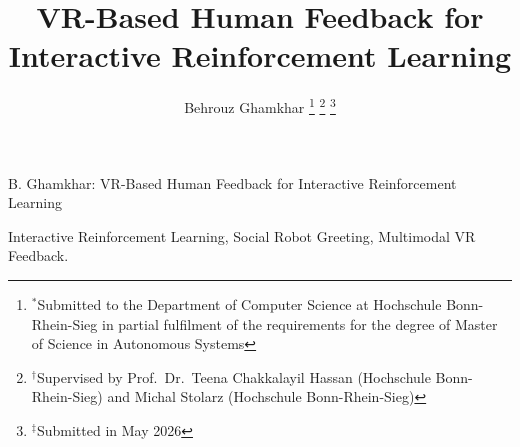 \documentclass[lettersize,journal]{IEEEtran}
\begin{document}
\title{VR-Based Human Feedback for Interactive Reinforcement Learning}

\author{Behrouz Ghamkhar
\thanks{$^*$Submitted to the Department of Computer Science at Hochschule Bonn-Rhein-Sieg in partial fulfilment of the requirements for the degree of Master of Science in Autonomous Systems}
\thanks{$^{\dagger}$Supervised by Prof.\ Dr.\ Teena Chakkalayil Hassan (Hochschule Bonn-Rhein-Sieg) and Michal Stolarz (Hochschule Bonn-Rhein-Sieg)}
\thanks{$^{\ddagger}$Submitted in May 2026}} %

%
{B. Ghamkhar: VR-Based Human Feedback for Interactive Reinforcement Learning}

\maketitle



\begin{IEEEkeywords}
Interactive Reinforcement Learning, Social Robot Greeting, Multimodal VR Feedback.
\end{IEEEkeywords}














\end{document}
